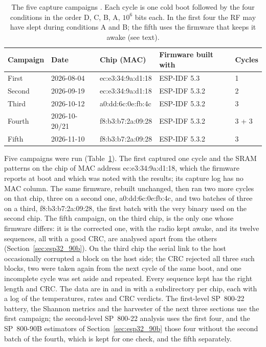 \begin{table}[htbp]
\centering
\caption{The five capture campaigns \meas{}. Each cycle is one cold boot
followed by the four conditions in the order D, C, B, A, $10^6$ bits
each. In the first four the RF may have slept during conditions A and B;
the fifth uses the firmware that keeps it awake (see text).}
\label{tab:esp32_campaigns}
\footnotesize
\begin{tabular}{@{}lllll@{}}
\toprule
Campaign & Date & Chip (MAC) & Firmware built with & Cycles \\
\midrule
First  & 2026-08-04 & ec:e3:34:9a:d1:18 & ESP-IDF 5.3   & 1 \\
Second & 2026-09-19 & ec:e3:34:9a:d1:18 & ESP-IDF 5.3.2 & 2 \\
Third  & 2026-10-12 & a0:dd:6c:0e:fb:4c & ESP-IDF 5.3.2 & 3 \\
Fourth & 2026-10-20/21 & f8:b3:b7:2a:09:28 & ESP-IDF 5.3.2 & 3 + 3 \\
Fifth  & 2026-11-10 & f8:b3:b7:2a:09:28 & ESP-IDF 5.3.2 & 3 \\
\bottomrule
\end{tabular}
\end{table}

Five campaigns were run (Table~\ref{tab:esp32_campaigns}). The first
captured one cycle and the SRAM patterns on the chip of MAC address
ec:e3:34:9a:d1:18, which the firmware reports at boot and which was noted
with the results; its capture log has no MAC column.
The same firmware, rebuilt unchanged, then ran two more cycles on that
chip, three on a second one, a0:dd:6c:0e:fb:4c, and two batches of three
on a third, f8:b3:b7:2a:09:28, the first batch with the very binary used
on the second chip. The fifth campaign, on the third chip, is the only
one whose firmware differs: it is the corrected one, with the radio kept
awake, and its twelve sequences, all with a good CRC, are analysed apart
from the others (Section~\ref{sec:esp32_90b}).
On the third chip the serial link to the host occasionally corrupted a
block on the host side; the CRC rejected all three such blocks, two were
taken again from the next cycle of the same boot, and one incomplete
cycle was set aside and repeated. Every sequence kept has the right
length and CRC. The data are in  and in
 with a subdirectory per chip, each with
a log of the temperatures, rates and CRC verdicts. The first-level
SP~800-22 battery, the Shannon metrics and the harvester of the next
three sections use the first campaign; the second-level SP~800-22
analysis uses the first four, and the SP~800-90B estimators of
Section~\ref{sec:esp32_90b} those four without the second batch of the
fourth, which is kept for one check, and the fifth separately.

